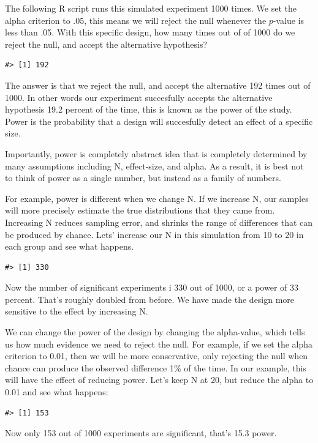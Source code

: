 \documentclass[
  letterpaper,
  DIV=11,
  numbers=noendperiod]{scrreprt}
\begin{document}
The following R script runs this simulated experiment 1000 times. We set
the alpha criterion to .05, this means we will reject the null whenever
the \(p\)-value is less than .05. With this specific design, how many
times out of of 1000 do we reject the null, and accept the alternative
hypothesis?

\begin{verbatim}
#> [1] 192
\end{verbatim}

The answer is that we reject the null, and accept the alternative 192
times out of 1000. In other words our experiment succesfully accepts the
alternative hypothesis 19.2 percent of the time, this is known as the
power of the study. Power is the probability that a design will
succesfully detect an effect of a specific size.

Importantly, power is completely abstract idea that is completely
determined by many assumptions including N, effect-size, and alpha. As a
result, it is best not to think of power as a single number, but instead
as a family of numbers.

For example, power is different when we change N. If we increase N, our
samples will more precisely estimate the true distributions that they
came from. Increasing N reduces sampling error, and shrinks the range of
differences that can be produced by chance. Lets' increase our N in this
simulation from 10 to 20 in each group and see what happens.

\begin{verbatim}
#> [1] 330
\end{verbatim}

Now the number of significant experiments i 330 out of 1000, or a power
of 33 percent. That's roughly doubled from before. We have made the
design more sensitive to the effect by increasing N.

We can change the power of the design by changing the alpha-value, which
tells us how much evidence we need to reject the null. For example, if
we set the alpha criterion to 0.01, then we will be more conservative,
only rejecting the null when chance can produce the observed difference
1\% of the time. In our example, this will have the effect of reducing
power. Let's keep N at 20, but reduce the alpha to 0.01 and see what
happens:

\begin{verbatim}
#> [1] 153
\end{verbatim}

Now only 153 out of 1000 experiments are significant, that's 15.3 power.
\end{document}
